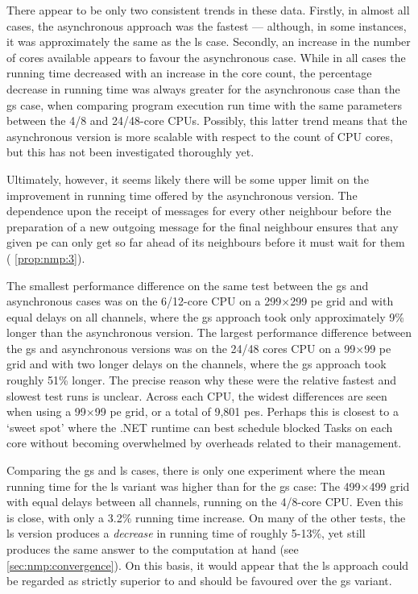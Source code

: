 There appear to be only two consistent trends in these data.  Firstly, in almost all cases, the asynchronous approach was the fastest --- although, in some instances, it was approximately the same as the \gls{ls} case.  Secondly, an increase in the number of cores available appears to favour the asynchronous case.  While in all cases the running time decreased with an increase in the core count, the percentage decrease in running time was always greater for the asynchronous case than the \gls{gs} case, when comparing program execution run time with the same parameters between the 4/8 and 24/48-core CPUs.  Possibly, this latter trend means that the asynchronous version is more scalable with respect to the count of CPU cores, but this has not been investigated thoroughly yet.

Ultimately, however, it seems likely there will be some upper limit on the improvement in running time offered by the asynchronous version.  The dependence upon the receipt of messages for every other neighbour before the preparation of a new outgoing message for the final neighbour ensures that any given \gls{pe} can only get so far ahead of its neighbours before it must wait for them (\ala{} \cref{prop:nmp:3}).

The smallest performance difference on the same test between the \gls{gs} and asynchronous cases was on the 6/12-core CPU on a 299×299 \gls{pe} grid and with equal delays on all channels, where the \gls{gs} approach took only approximately 9\% longer than the asynchronous version.  The largest performance difference between the \gls{gs} and asynchronous versions was on the 24/48 cores CPU on a 99×99 \gls{pe} grid and with two longer delays on the channels, where the \gls{gs} approach took roughly 51\% longer.  The precise reason why these were the relative fastest and slowest test runs is unclear.  Across each CPU, the widest differences are seen when using a 99×99 \gls{pe} grid, or a total of 9,801 \glspl{pe}.  Perhaps this is closest to a `sweet spot' where the .NET runtime can best schedule blocked Tasks on each core without becoming overwhelmed by overheads related to their management.

Comparing the \gls{gs} and \gls{ls} cases, there is only one experiment where the mean running time for the \gls{ls} variant was higher than for the \gls{gs} case:  The 499×499 grid with equal delays between all channels, running on the 4/8-core CPU.  Even this is close, with only a 3.2\% running time increase.   On many of the other tests, the \gls{ls} version produces a \emph{decrease} in running time of roughly 5-13\%, yet still produces the same answer to the computation at hand (see \cref{sec:nmp:convergence}).  On this basis, it would appear that the \gls{ls} approach could be regarded as strictly superior to and should be favoured over the \gls{gs} variant.

